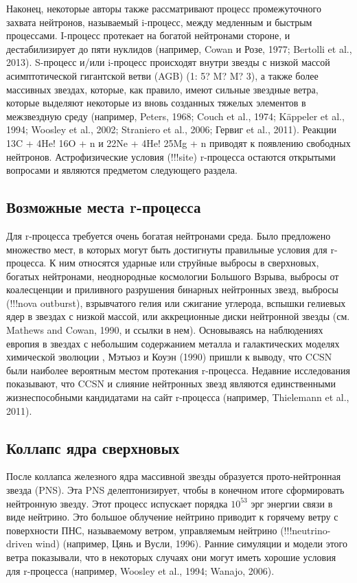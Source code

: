 \documentclass[%
bachelor,    %
natbib,      %
subf,        %
href,        %
colorlinks,  %
]{disser}
\begin{document}
Наконец, некоторые авторы также рассматривают процесс промежуточного захвата нейтронов, называемый
i-процесс, между медленным и быстрым процессами. I-процесс протекает на богатой нейтронами стороне, и дестабилизирует до пяти нуклидов (например, Cowan и Розе, 1977; Bertolli et al., 2013). S-процесс и/или i-процесс происходят внутри звезды с низкой массой асимптотической гигантской ветви (AGB) (1: 5? M? M? 3), а также более массивных звездах, которые, как правило, имеют сильные звездные ветра, которые выделяют некоторые из вновь созданных тяжелых элементов в межзвездную среду (например, Peters, 1968; Couch et al., 1974; Käppeler et al., 1994; Woosley et al., 2002; Straniero et al., 2006; Гервиг et al., 2011). Реакции 13C + 4He! 16O + n и 22Ne + 4He! 25Mg + n приводят к появлению свободных нейтронов. Астрофизические условия (!!!site) r-процесса остаются открытыми вопросами и являются предметом следующего раздела.

\subsection{Возможные места r-процесса}

Для r-процесса требуется очень богатая нейтронами среда. Было предложено множество мест, в которых могут быть достигнуты правильные условия для r-процесса. К ним относятся ударные или струйные выбросы в сверхновых, богатых нейтронами, неоднородные космологии Большого Взрыва, выбросы от коалесценции и приливного разрушения бинарных нейтронных звезд, выбросы (!!!nova outburst), взрывчатого гелия или сжигание углерода, вспышки гелиевых ядер в звездах с низкой массой, или аккреционные диски нейтронной звезды (см. Mathews and Cowan, 1990, и ссылки в нем). Основываясь на наблюдениях европия в звездах с небольшим содержанием металла и галактических моделях химической эволюции , Мэтьюз и Коуэн (1990) пришли к выводу, что CCSN были наиболее вероятным местом протекания r-процесса. Недавние исследования показывают, что CCSN и слияние нейтронных звезд являются единственными жизнеспособными кандидатами на сайт r-процесса (например, Thielemann et al., 2011).

\subsection{Коллапс ядра сверхновых}

После коллапса железного ядра массивной звезды образуется прото-нейтронная звезда (PNS). Эта PNS делептонизирует, чтобы в конечном итоге сформировать нейтронную звезду. Этот процесс испускает порядка $10^{53}$ эрг
энергии связи в виде нейтрино. Это большое облучение нейтрино приводит к горячему ветру с поверхности ПНС, называемому ветром, управляемым нейтрино (!!!neutrino-driven wind) (например, Цянь и Вусли, 1996). Ранние симуляции и модели этого ветра показывали, что в некоторых случаях они могут иметь хорошие условия для r-процесса (например, Woosley et al., 1994; Wanajo, 2006).
\end{document}
